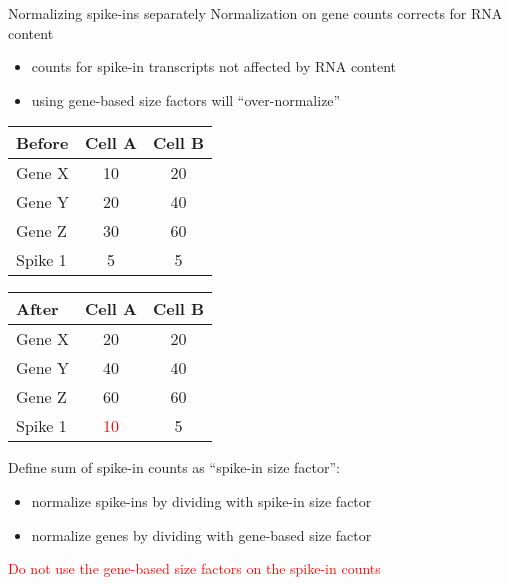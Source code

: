 \documentclass{beamer}
\begin{document}
\begin{frame}{Normalizing spike-ins separately}
Normalization on gene counts corrects for RNA content
\begin{itemize}
    \item counts for spike-in transcripts not affected by RNA content
    \item using gene-based size factors will ``over-normalize''
\end{itemize}
\begin{center}
    \begin{minipage}{0.49\textwidth}
        \begin{tabular}{|l|c c|}
            \hline
            \textbf{Before}
                   & Cell A & Cell B \\
            \hline
            Gene X & 10 & 20 \\
            Gene Y & 20 & 40 \\
            Gene Z & 30 & 60 \\
            Spike 1 & 5 & 5  \\
            \hline
        \end{tabular}
        \end{minipage}
    \begin{minipage}{0.49\textwidth}
        \begin{tabular}{|l|c c|}
            \hline
            \textbf{After}
                   & Cell A & Cell B \\
            \hline
            Gene X & 20 & 20 \\
            Gene Y & 40 & 40 \\
            Gene Z & 60 & 60 \\
            Spike 1 & \textcolor{red}{10} & 5  \\
            \hline
        \end{tabular}
        \end{minipage}
    \end{center}
Define sum of spike-in counts as ``spike-in size factor'':
\begin{itemize}
    \item normalize spike-ins by dividing with spike-in size factor
    \item normalize genes by dividing with gene-based size factor
\end{itemize}
\pause
\textcolor{red}{Do not use the gene-based size factors on the spike-in counts}
\end{frame}
\end{document}
